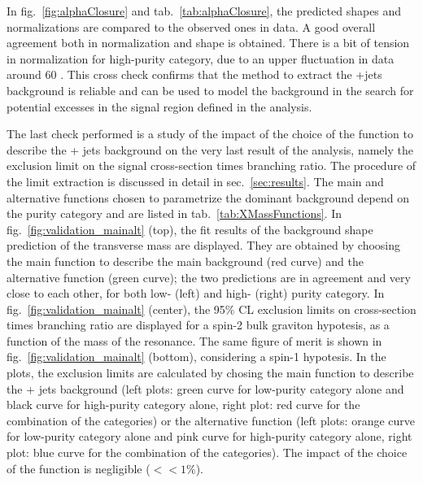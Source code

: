 \noindent In fig.~\ref{fig:alphaClosure} and tab.~\ref{tab:alphaClosure}, the predicted shapes and normalizations are compared to the observed ones in data. 
A good overall agreement both in normalization and shape is obtained. There is a bit of tension in normalization for high-purity category, due to an upper fluctuation in data around 60 \GeV. This cross check confirms that the method to extract the \V+jets background is reliable and can be used to model the background in the search for potential excesses in the signal region defined in the analysis.

\vspace*{1\baselineskip}

\noindent The last check performed is a study of the impact of the choice of the function to describe the \V + jets background on the very last result of the analysis, namely the exclusion limit on the signal cross-section times branching ratio. The procedure of the limit extraction is discussed in detail in sec.~\ref{sec:results}. The main and alternative functions chosen to parametrize the dominant background depend on the purity category and are listed in tab.~\ref{tab:XMassFunctions}. In fig.~\ref{fig:validation_mainalt} (top), the fit results of the background shape prediction of the transverse mass are displayed. They are obtained by choosing the main function to describe the main background (red curve) and the alternative function (green curve); the two predictions are in agreement and very close to each other, for both low- (left) and high- (right) purity category. In fig.~\ref{fig:validation_mainalt} (center), the 95\% CL exclusion limits on cross-section times branching ratio are displayed for a spin-2 bulk graviton hypotesis, as a function of the mass of the resonance. The same figure of merit is shown in fig.~\ref{fig:validation_mainalt} (bottom), considering a spin-1 \Wp hypotesis. In the plots, the exclusion limits are calculated by chosing the main function to describe the \V + jets background (left plots: green curve for low-purity category alone and black curve for high-purity category alone, right plot: red curve for the combination of the categories) or the alternative function (left plots: orange curve for low-purity category alone and pink curve for high-purity category alone, right plot: blue curve for the combination of the categories). The impact of the choice of the function is negligible ($<<1 \%$).


